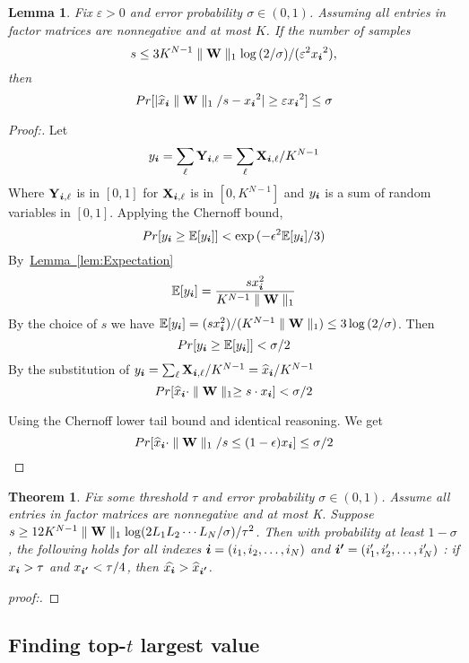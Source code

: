 \documentclass{article}
\newcommand{\V}[1]{{\bm{{\MakeLowercase{#1}}}}}%
\newcommand{\M}[1]{{\bm{\mathbf{\MakeUppercase{#1}}}}}%
\newcommand{\norm}[2]{\parallel#1\parallel_{#2}}
\newcommand{\Lem}[1]{\hyperref[lem:#1]{Lemma~\ref*{lem:#1}}} %
\newtheorem{lemma}{Lemma}[section]
\newtheorem{theorem}{Theorem}[section]
\begin{document}
\begin{lemma}\label{lem:Bound}
Fix $\varepsilon > 0$ and error probability $\sigma \in (0,1)$. Assuming all entries in factor matrices are nonnegative and at most $K$. If the number of samples
\[
s \leq 3K^{N-1}\norm{\M{W}}{1}\log{(2/\sigma)}/(\varepsilon ^2{x_{\V{i}}}^2),
\]
then
\[
Pr[|{\widehat{x}_{\V{i}}}\norm{\M{W}}{1}/s-{x_{\V{i}}}^2| \geq \varepsilon{x_{\V{i}}}^2] \leq \sigma
\]
\end{lemma}

\begin{proof}[Proof:]
Let
\[
    y_{\V{i}} = \sum_{\ell}\M{Y}_{\V{i},\ell} = \sum_{\ell}\M{X}_{\V{i},\ell}/K^{N-1}
\]
Where $\M{Y}_{\V{i},\ell}$ is in $[0,1]$ for $\M{X}_{\V{i},\ell}$ is in $[0,K^{N-1}]$ and $y_{\V{i}}$ is a sum of random variables in $[0,1]$.
Applying the Chernoff bound,
\[
Pr[y_{\V{i}} \geq \mathbb{E}[y_{\V{i}}]] < \exp{(-\epsilon^2\mathbb{E}[y_{\V{i}}]/3)}
\]
By~\Lem{Expectation}
\[
\mathbb{E}[y_{\V{i}}] = \frac{sx^2_{\V{i}}}{K^{N-1}\norm{\M{W}}{1}}
\]
By the choice of $s$ we have $\mathbb{E}[y_{\V{i}}]=(sx^2_{\V{i}})/(K^{N-1}\norm{\M{W}}{1}) \leq 3\log{(2/\sigma)}$. Then
\[
Pr[y_{\V{i}} \geq \mathbb{E}[y_{\V{i}}]] < \sigma/2
\]
By the substitution of $y_{\V{i}}=\sum_{\ell}\M{X}_{\V{i},\ell}/K^{N-1}=\widehat{x}_{\V{i}}/K^{N-1}$
\[
Pr[\widehat{x}_{\V{i}}\cdot\norm{\M{W}}{1} \geq s\cdot x_{\V{i}}] < \sigma/2
\]

Using the Chernoff lower tail bound and identical reasoning. We get
\[
Pr[\widehat{x}_{\V{i}}\cdot\norm{\M{W}}{1}/s \leq (1-\epsilon)x_{\V{i}}] \leq \sigma/2
\]
\end{proof}

\begin{theorem}\label{theo:Order}
Fix some threshold $\tau$ and error probability $\sigma\in(0,1)$. Assume all entries in factor matrices are nonnegative and at most  K. Suppose $s \geq 12K^{N-1}\norm{\M{W}}{1}\log(2L_1L_2\cdots L_N/\sigma)/{\tau^2}$. Then with probability at least $1-\sigma$, the following holds for all indexes $\V{i} = (i_1,i_2,\ldots,i_N)$ and $\V{i'} = (i'_1,i'_2,\ldots,i'_N)$ : if $x_{\V{i}}>\tau$ and $ x_{\V{i'}} < \tau/4$, then $\widehat{x_{\V{i}}}>\widehat{x}_{\V{i'}}$.
\end{theorem}

\begin{proof}[proof:]

\end{proof}
\subsection{Finding top-$t$ largest value}
\end{document}

